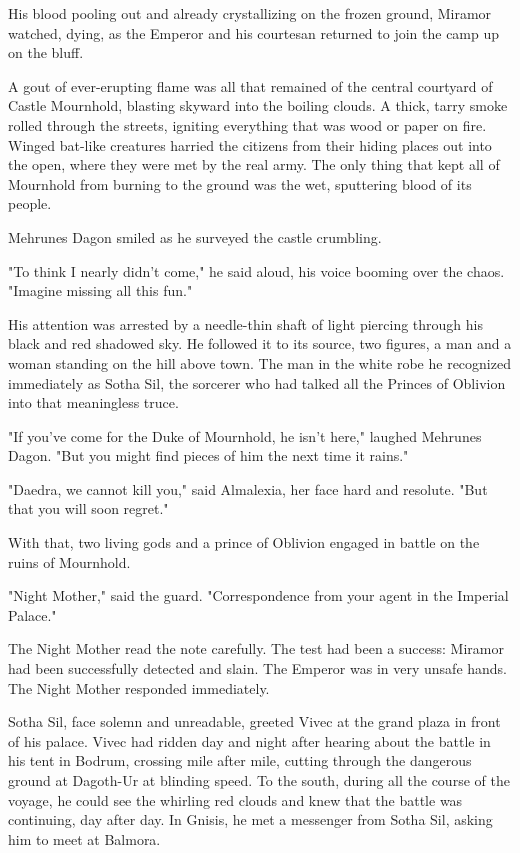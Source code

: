 His blood pooling out and already crystallizing on the frozen ground, Miramor watched, dying, as the Emperor and his courtesan returned to join the camp up on the bluff.

A gout of ever-erupting flame was all that remained of the central courtyard of Castle Mournhold, blasting skyward into the boiling clouds. A thick, tarry smoke rolled through the streets, igniting everything that was wood or paper on fire. Winged bat-like creatures harried the citizens from their hiding places out into the open, where they were met by the real army. The only thing that kept all of Mournhold from burning to the ground was the wet, sputtering blood of its people.

Mehrunes Dagon smiled as he surveyed the castle crumbling.

"To think I nearly didn't come," he said aloud, his voice booming over the chaos. "Imagine missing all this fun."

His attention was arrested by a needle-thin shaft of light piercing through his black and red shadowed sky. He followed it to its source, two figures, a man and a woman standing on the hill above town. The man in the white robe he recognized immediately as Sotha Sil, the sorcerer who had talked all the Princes of Oblivion into that meaningless truce.

"If you've come for the Duke of Mournhold, he isn't here," laughed Mehrunes Dagon. "But you might find pieces of him the next time it rains."

"Daedra, we cannot kill you," said Almalexia, her face hard and resolute. "But that you will soon regret."

With that, two living gods and a prince of Oblivion engaged in battle on the ruins of Mournhold.

"Night Mother," said the guard. "Correspondence from your agent in the Imperial Palace."

The Night Mother read the note carefully. The test had been a success: Miramor had been successfully detected and slain. The Emperor was in very unsafe hands. The Night Mother responded immediately.

Sotha Sil, face solemn and unreadable, greeted Vivec at the grand plaza in front of his palace. Vivec had ridden day and night after hearing about the battle in his tent in Bodrum, crossing mile after mile, cutting through the dangerous ground at Dagoth-Ur at blinding speed. To the south, during all the course of the voyage, he could see the whirling red clouds and knew that the battle was continuing, day after day. In Gnisis, he met a messenger from Sotha Sil, asking him to meet at Balmora.

